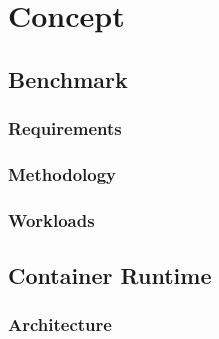 \chapter{Concept}
\label{ch:concept}
\section{Benchmark}

\subsection{Requirements}

\subsection{Methodology}

\subsection{Workloads}

\section{Container Runtime}

\subsection{Architecture}